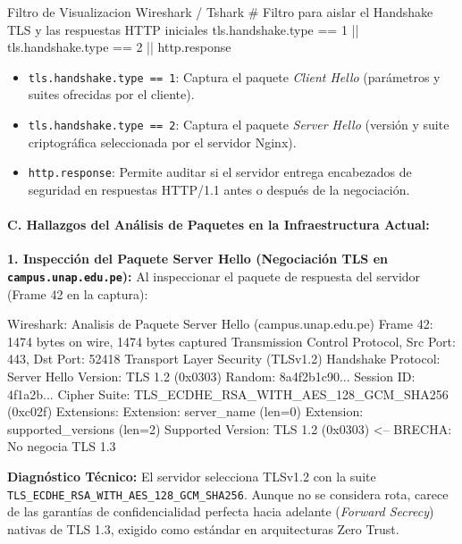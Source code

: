 \begin{cmdbox}{Filtro de Visualizacion Wireshark / Tshark}
# Filtro para aislar el Handshake TLS y las respuestas HTTP iniciales
tls.handshake.type == 1 || tls.handshake.type == 2 || http.response
\end{cmdbox}

\begin{itemize}
    \item \texttt{tls.handshake.type == 1}: Captura el paquete \textit{Client Hello} (parámetros y suites ofrecidas por el cliente).
    \item \texttt{tls.handshake.type == 2}: Captura el paquete \textit{Server Hello} (versión y suite criptográfica seleccionada por el servidor Nginx).
    \item \texttt{http.response}: Permite auditar si el servidor entrega encabezados de seguridad en respuestas HTTP/1.1 antes o después de la negociación.
\end{itemize}

\newpage
\paragraph{C. Hallazgos del Análisis de Paquetes en la Infraestructura Actual:}

\textbf{1. Inspección del Paquete Server Hello (Negociación TLS en \texttt{campus.unap.edu.pe}):} Al inspeccionar el paquete de respuesta del servidor (Frame 42 en la captura):

\begin{cmdbox}{Wireshark: Analisis de Paquete Server Hello (campus.unap.edu.pe)}
Frame 42: 1474 bytes on wire, 1474 bytes captured
Transmission Control Protocol, Src Port: 443, Dst Port: 52418
Transport Layer Security (TLSv1.2)
    Handshake Protocol: Server Hello
        Version: TLS 1.2 (0x0303)
        Random: 8a4f2b1c90...
        Session ID: 4f1a2b...
        Cipher Suite: TLS_ECDHE_RSA_WITH_AES_128_GCM_SHA256 (0xc02f)
        Extensions:
            Extension: server_name (len=0)
            Extension: supported_versions (len=2)
                Supported Version: TLS 1.2 (0x0303)   <-- BRECHA: No negocia TLS 1.3
\end{cmdbox}

\textbf{Diagnóstico Técnico:} El servidor selecciona TLSv1.2 con la suite \texttt{TLS\_ECDHE\_RSA\_WITH\_AES\_128\_GCM\_SHA256}. Aunque no se considera rota, carece de las garantías de confidencialidad perfecta hacia adelante (\textit{Forward Secrecy}) nativas de TLS 1.3, exigido como estándar en arquitecturas Zero Trust.

